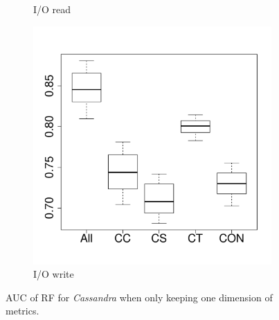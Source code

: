 \documentclass[10pt,journal,compsoc]{IEEEtran}
\begin{document}
\begin{figure}[t]
\begin{subfigure}{0.19\textwidth}
                \caption{I/O read}
        \end{subfigure}
        \begin{subfigure}{0.19\textwidth}
                \includegraphics[width=\linewidth]{Figures/iowrite-cassandrakeep-importance.pdf}
                \caption{I/O write}
        \end{subfigure}
        
	\caption{AUC of RF for \emph{Cassandra} when only keeping one dimension of metrics.}
	\label{fig:importance-dimenssion-keep-cassandra}
\end{figure}
\end{document}
